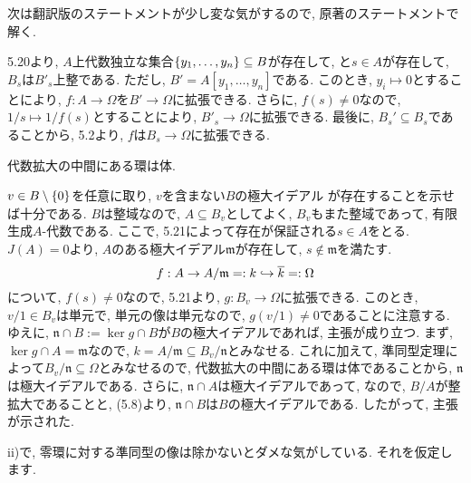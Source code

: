 \documentclass[dvipdfmx]{jsarticle}
\begin{document}
    \color{red}
    次は翻訳版のステートメントが少し変な気がするので, 原著のステートメントで解く.
    \color{black}

    \begin{problem}
        5.20より, $A$上代数独立な集合$\{y_1, \dots, y_n\} \subseteq B$が存在して,
        と$s \in A$が存在して, $B_s$は$B'_s$上整である.
        ただし, $B' = A[y_1, \dots, y_n]$である.
        このとき, $y_i \mapsto 0$とすることにより, $f: A\to \Omega$を$B' \to \Omega$に拡張できる.
        さらに, $f(s) \neq 0$なので, $1/s \mapsto 1/f(s)$とすることにより, $B'_s \to \Omega$に拡張できる.
        最後に, $B_s' \subseteq B_s$であることから,
        5.2より, $f$は$B_s \to \Omega$に拡張できる.
    \end{problem}

    \begin{lemma}
        代数拡大の中間にある環は体.
    \end{lemma}

    \begin{problem}
        $v \in B \setminus \{0\}$を任意に取り, $v$を含まない$B$の極大イデアル
        が存在することを示せば十分である.
        $B$は整域なので, $A \subseteq B_v$としてよく, $B_v$もまた整域であって,
        有限生成$A$-代数である.
        ここで, 5.21によって存在が保証される$s \in A$をとる.
        $J(A) = 0$より, $A$のある極大イデアル$\mathfrak{m}$が存在して, $s \notin \mathfrak{m}$を満たす.
        \[
            f: A \to A/\mathfrak{m} =: k \hookrightarrow \overline{k} =: \Omega
        \]
        について, $f(s) \neq 0$なので, 5.21より, $g: B_v \to \Omega$に拡張できる.
        このとき, $v/1 \in B_v$は単元で, 単元の像は単元なので, $g(v/1) \neq 0$であることに注意する.
        ゆえに, $\mathfrak{n} \cap B := \ker{g} \cap B$が$B$の極大イデアルであれば, 主張が成り立つ.
        まず, $\ker{g} \cap A = \mathfrak{m}$なので,
        $k = A/\mathfrak{m} \subseteq B_v/\mathfrak{n}$とみなせる.
        これに加えて, 準同型定理によって$B_v/\mathfrak{n} \subseteq \Omega$とみなせるので,
        代数拡大の中間にある環は体であることから, $\mathfrak{n}$は極大イデアルである.
        さらに, $\mathfrak{n} \cap A$は極大イデアルであって,
        なので, $B/A$が整拡大であることと, (5.8)より, $\mathfrak{n} \cap B$は$B$の極大イデアルである.
        したがって, 主張が示された.
    \end{problem}

    \color{red}
    ii)で, 零環に対する準同型の像は除かないとダメな気がしている.
    それを仮定します.
    \color{black}
\end{document}

